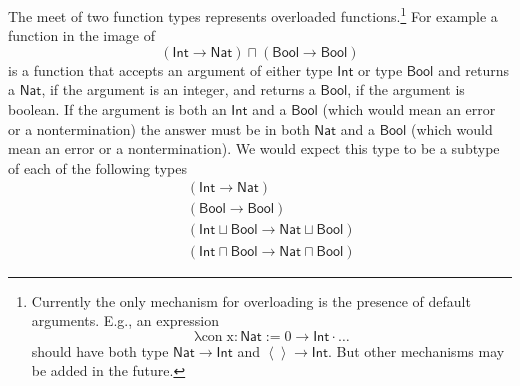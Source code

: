 \documentclass[12pt]{article}
\begin{document}
The meet of two function types represents overloaded functions.\footnote{%
Currently the only mechanism for overloading is the presence of default
arguments. E.g., an expression%
\begin{equation*}
\mathrm{\lambda con\;x:\mathsf{Nat}:=0\rightarrow \mathsf{Int}\cdot \ldots }
\end{equation*}%
should have both type $\mathsf{Nat\rightarrow Int}$ and $\left\langle
{}\right\rangle \rightarrow \mathsf{Int}$. But other mechanisms may be added
in the future.} For example a function in the image of%
\begin{equation*}
\left( \mathsf{Int}\rightarrow \mathsf{Nat}\right) \sqcap \left( \mathsf{Bool%
}\rightarrow \mathsf{Bool}\right) 
\end{equation*}%
is a function that accepts an argument of either type $\mathsf{Int}$ or type 
$\mathsf{Bool}$ and returns a $\mathsf{Nat}$, if the argument is an integer,
and returns a $\mathsf{Bool}$, if the argument is boolean. If the argument
is both an $\mathsf{Int}$ and a $\mathsf{Bool}$ (which would mean an error
or a nontermination) the answer must be in both $\mathsf{Nat}$ and a $%
\mathsf{Bool}$ (which would mean an error or a nontermination). We would
expect this type to be a subtype of each of the following types%
\begin{eqnarray*}
&&\left( \mathsf{Int}\rightarrow \mathsf{Nat}\right)  \\
&&\left( \mathsf{Bool}\rightarrow \mathsf{Bool}\right)  \\
&&\left( \mathsf{Int}\sqcup \mathsf{Bool}\rightarrow \mathsf{Nat}\sqcup 
\mathsf{Bool}\right)  \\
&&\left( \mathsf{Int}\sqcap \mathsf{Bool}\rightarrow \mathsf{Nat\sqcap Bool}%
\right) 
\end{eqnarray*}
\end{document}
